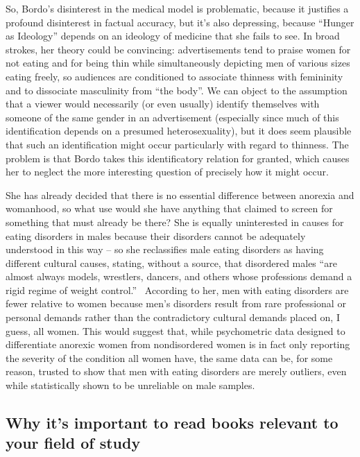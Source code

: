 \documentclass[11pt]{article}
\begin{document}
    So, Bordo's disinterest in the medical model is problematic, because it justifies a profound disinterest in factual accuracy, but it's also depressing, because ``Hunger as Ideology'' depends on an ideology of medicine that she fails to see. In broad strokes, her theory could be convincing: advertisements tend to praise women for not eating and for being thin while simultaneously depicting men of various sizes eating freely, so audiences are conditioned to associate thinness with femininity and to dissociate masculinity from ``the body''. We can object to the assumption that a viewer would necessarily (or even usually) identify themselves with someone of the same gender in an advertisement (especially since much of this identification depends on a presumed heterosexuality), but it does seem plausible that such an identification might occur particularly with regard to thinness. The problem is that Bordo takes this identificatory relation for granted, which causes her to neglect the more interesting question of precisely how it might occur. 

    She has already decided that there is no essential difference between anorexia and womanhood, so what use would she have anything that claimed to screen for something that must already be there? She is equally uninterested in causes for eating disorders in males because their disorders cannot be adequately understood in this way -- so she reclassifies male eating disorders as having different cultural causes, stating, without a source, that disordered males ``are almost always models, wrestlers, dancers, and others whose professions demand a rigid regime of weight control.''~\autocite[53]{Bordo03} According to her, men with eating disorders are fewer relative to women because men's disorders result from rare professional or personal demands rather than the contradictory cultural demands placed on, I guess, all women. This would suggest that, while psychometric data designed to differentiate anorexic women from nondisordered women is in fact only reporting the severity of the condition all women have, the same data can be, for some reason, trusted to show that men with eating disorders are merely outliers, even while statistically shown to be unreliable on male samples. 
    
    \subsection*{Why it's important to read books relevant to your field of study}
\end{document}
